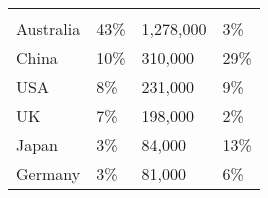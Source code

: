 \begin{tabular}[t]{p{3cm}>{\hfill}p{1.3cm}>{\hfill}p{1.1cm}>{\hfill}p{1.7cm}}
      &   &     &    \\ 
 Australia & 43\% & 1,278,000 & 3\% \\ 
  China & 10\% &   310,000 & 29\% \\ 
  USA & 8\% &   231,000 & 9\% \\ 
  UK & 7\% &   198,000 & 2\% \\ 
  Japan & 3\% &    84,000 & 13\% \\ 
  Germany & 3\% &    81,000 & 6\% \\ 
  \end{tabular}
